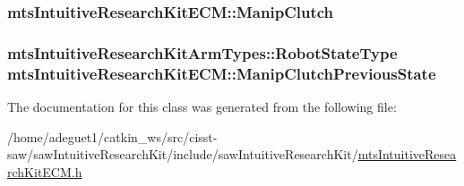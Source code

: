 \hypertarget{classmts_intuitive_research_kit_e_c_m_abb5e805cd25cb99784ddf142e0b671c8}{
\subsubsection[{Manip\-Clutch}]{ mts\-Intuitive\-Research\-Kit\-E\-C\-M\-::\-Manip\-Clutch}}\label{classmts_intuitive_research_kit_e_c_m_abb5e805cd25cb99784ddf142e0b671c8}
\hypertarget{classmts_intuitive_research_kit_e_c_m_a8e17d129e26e3f66c71c4b128f1e8c44}{
\subsubsection[{Manip\-Clutch\-Previous\-State}]{\setlength{\rightskip}{0pt plus 5cm}mts\-Intuitive\-Research\-Kit\-Arm\-Types\-::\-Robot\-State\-Type mts\-Intuitive\-Research\-Kit\-E\-C\-M\-::\-Manip\-Clutch\-Previous\-State}}\label{classmts_intuitive_research_kit_e_c_m_a8e17d129e26e3f66c71c4b128f1e8c44}


The documentation for this class was generated from the following file\-:\begin{DoxyCompactItemize}
\item 
/home/adeguet1/catkin\-\_\-ws/src/cisst-\/saw/saw\-Intuitive\-Research\-Kit/include/saw\-Intuitive\-Research\-Kit/\hyperlink{mts_intuitive_research_kit_e_c_m_8h}{mts\-Intuitive\-Research\-Kit\-E\-C\-M.\-h}\end{DoxyCompactItemize}
